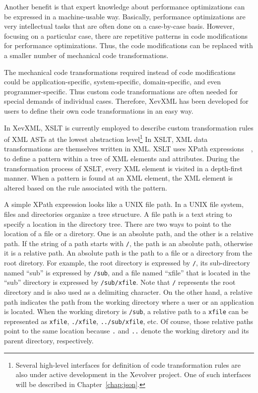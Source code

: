 Another benefit is that expert knowledge about performance optimizations
can be expressed in a machine-usable way.  Basically, performance
optimizations are very intellectual tasks that are often done on a
case-by-case basis.  However, focusing on a particular case, there are
repetitive patterns in code modifications for performance
optimizations. Thus, the code modifications can be replaced with a
smaller number of mechanical code transformations.

The mechanical code transformations required instead of code
modifications could be application-specific, system-specific,
domain-specific, and even programmer-specific. Thus custom code
transformations are often needed for special demands of individual
cases.  Therefore, XevXML has been developed for users to define their
own code transformations in an easy way.

In XevXML, XSLT is currently employed to describe custom
transformation rules of XML ASTs at the lowest abstraction
level\footnote{Several high-level interfaces for definition of code
transformation rules are also under active development in the Xevolver
project.  One of such interfaces will be described in
Chapter~\ref{chap:json}.}  In XSLT, XML data transformations are
themselves written in XML.  XSLT uses XPath
expressions~\cite{xpath}~\cite{Kay08xslt}, to define a pattern within
a tree of XML elements and attributes.  During the transformation
process of XSLT, every XML element is visited in a depth-first manner.
When a pattern is found at an XML element, the XML element is altered
based on the rule associated with the pattern.

A simple XPath expression looks like a UNIX file path. In a UNIX file
system, files and directories organize a tree structure. A file path is
a text string to specify a location in the directory tree.  There are
two ways to point to the location of a file or a diretory.  One is an
absolute path, and the other is a relative path.  If the string of a
path starts with \texttt{/}, the path is an absolute path, otherwise it
is a relative path. An absolute path is the path to a file or a
directory from the root diretory. For example, the root directory is
expressed by \texttt{/}, its sub-directory named ``sub'' is expressed by
\texttt{/sub}, and a file named ``xfile'' that is located in the ``sub''
directory is expressed by \texttt{/sub/xfile}.  Note that \texttt{/}
represents the root directory and is also used as a delimiting
character.  On the other hand, a relative path indicates the path from
the working directory where a user or an application is located. When
the working diretory is \texttt{/sub}, a relative path to a
\texttt{xfile} can be represented as \texttt{xfile}, \texttt{./xfile},
\texttt{../sub/xfile}, etc.  Of course, those relative paths point to
the same location because \texttt{.} and \texttt{..} denote the working
diretory and its parent directory, respectively.

